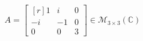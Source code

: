 \grupo{}

\begin{align*}
	A =
	\begin{bmatrix*}[r]
		1  & i  & 0\\
		-i & -1 & 0\\
		0  & 0  & 3
	\end{bmatrix*}
	\in \mathcal{M}_{3 \times 3} (\mathbb{C})
\end{align*}


